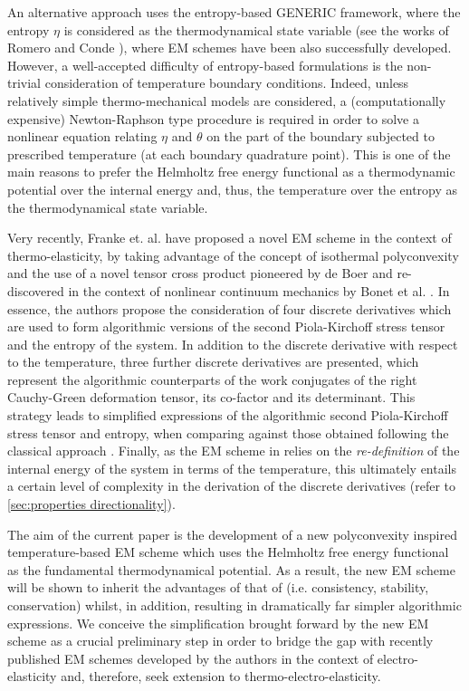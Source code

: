An alternative approach uses the entropy-based GENERIC framework,
where the entropy $\eta$ is considered as the thermodynamical state variable (see the works of Romero \cite{Romero2010} and Conde \cite{Conde2017}), where EM schemes have been also successfully developed. However, a well-accepted difficulty of entropy-based formulations is the non-trivial consideration of temperature boundary conditions. Indeed, unless relatively simple thermo-mechanical models are considered, a (computationally expensive) Newton-Raphson type procedure is required in order to solve a nonlinear equation relating $\eta$ and $\theta$ on the part of the boundary subjected to prescribed temperature (at each boundary quadrature point). This is one of the main reasons to prefer the Helmholtz free energy functional as a thermodynamic potential over the internal energy and, thus, the temperature over the entropy as the thermodynamical state variable. 

Very recently, Franke et. al. \cite{Betsch2018Thermo} have proposed a novel EM scheme in the context of thermo-elasticity, by taking advantage of the concept of isothermal polyconvexity \cite{Ball_1976,Ball_1976_2,Ball_2002,Ball_Murat_1976,Schroderbook} and the use of a novel tensor cross product pioneered by de Boer \cite{deBoer_book} and re-discovered in the context of nonlinear continuum mechanics by Bonet et al. \cite{Bonet_cross_product_2016,Bonet_polyconvexity_2015,Bonet_hyperbolicity_partI_2015}. In essence, the authors propose the consideration of four discrete derivatives which are used to form algorithmic versions of the second Piola-Kirchoff stress tensor and the entropy of the system. In addition to the discrete derivative with respect to the temperature, three further discrete derivatives are presented, which represent the algorithmic counterparts of the work conjugates of the right Cauchy-Green deformation tensor, its co-factor and its determinant. This strategy leads to simplified expressions of the algorithmic second Piola-Kirchoff stress tensor and entropy, when comparing against those obtained following the classical approach \cite{Gonzalez_EM_2000}. Finally, as the EM scheme in \cite{Betsch2018Thermo} relies on the \textit{re-definition} of the internal energy of the system in terms of the temperature, this ultimately entails a certain level of complexity in the derivation of the discrete derivatives (refer to \ref{sec:properties directionality}).   

The aim of the current paper is the development of a new polyconvexity inspired temperature-based EM scheme which uses the Helmholtz free energy functional as the fundamental thermodynamical potential. As a result, the new EM scheme will be shown to inherit the advantages of that of \cite{Betsch2018Thermo} (i.e. consistency, stability, conservation) whilst, in addition, resulting in dramatically far simpler algorithmic expressions. We conceive the simplification brought forward by the new EM scheme as a crucial preliminary step in order to bridge the gap with recently published EM schemes developed by the authors in the context of electro-elasticity \cite{EM_Electro_1} and, therefore, seek extension to thermo-electro-elasticity.

